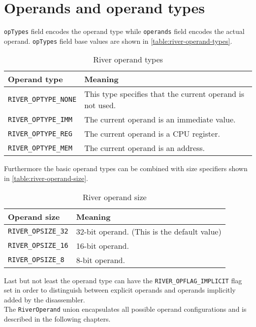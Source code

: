 \documentclass[12pt]{report}
\begin{document}
\section{Operands and operand types}
\label{sec:operands-and-operand-types}
\texttt{opTypes} field encodes the operand type while \texttt{operands} field encodes the actual operand. \texttt{opTypes} field base values are shown in \autoref{table:river-operand-types}.\\
\begin{table}[H]
	\begin{tabular}{| p{6cm} | p{10cm} |}
		\hline
		\textbf{Operand type} & \textbf{Meaning}\\ \hline
		\texttt{RIVER_OPTYPE_NONE} & This type specifies that the current operand is not used.\\ \hline
		\texttt{RIVER_OPTYPE_IMM} & The current operand is an immediate value.\\ \hline
		\texttt{RIVER_OPTYPE_REG} & The current operand is a CPU register.\\ \hline
		\texttt{RIVER_OPTYPE_MEM} & The current operand is an address.\\ \hline
	\end{tabular}
	\caption{River operand types}
	\label{table:river-operand-types}
\end{table}
Furthermore the basic operand types can be combined with size specifiers shown in \autoref{table:river-operand-size}.\\
\begin{table}[H]
	\begin{tabular}{| p{6cm} | p{10cm} |}
		\hline
		\textbf{Operand size} & \textbf{Meaning}\\ \hline
		\texttt{RIVER_OPSIZE_32} & 32-bit operand. (This is the default value)\\ \hline
		\texttt{RIVER_OPSIZE_16} & 16-bit operand.\\ \hline
		\texttt{RIVER_OPSIZE_8} & 8-bit operand.\\ \hline
	\end{tabular}
	\caption{River operand size}
	\label{table:river-operand-size}
\end{table}
Last but not least the operand type can have the \texttt{RIVER_OPFLAG_IMPLICIT} flag set in order to distinguish between explicit operands and operands implicitly added by the disassembler.\\
\newline
The \texttt{RiverOperand} union encapsulates all possible operand configurations and is described in the following chapters.\\
\end{document}

